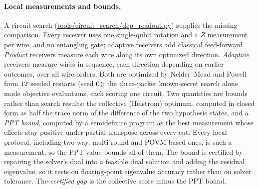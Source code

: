 \documentclass[10pt]{article}
\begin{document}
\paragraph{Local measurements and bounds.} A circuit search (\url{tools/circuit_search/dcp_readout.py}) supplies the missing comparison. Every receiver uses one single-qubit rotation and a $Z$ measurement per wire, and no entangling gate; adaptive receivers add classical feed-forward. \emph{Product} receivers measure each wire along its own optimized direction. \emph{Adaptive} receivers measure wires in sequence, each direction depending on earlier outcomes, over all wire orders. Both are optimized by Nelder--Mead and Powell from $12$ seeded restarts (seed $0$); the three-packet known-secret search alone made \CsThreeKnownCircuits{} objective evaluations, each scoring one circuit. Two quantities are bounds rather than search results: the collective (Helstrom) optimum, computed in closed form as half the trace norm of the difference of the two hypothesis states, and a \emph{PPT bound}, computed by a semidefinite program as the best measurement whose effects stay positive under partial transpose across every cut. Every local protocol, including two-way, multi-round and POVM-based ones, is such a measurement, so the PPT value bounds all of them. The bound is certified by repairing the solver's dual into a feasible dual solution and adding the residual eigenvalue, so it rests on floating-point eigenvalue accuracy rather than on solver tolerance. The \emph{certified gap} is the collective score minus the PPT bound.
\end{document}
